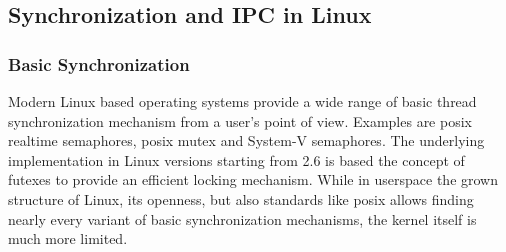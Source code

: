 %
%
%
%
%
%
%
%
%

\subsection{Synchronization and IPC in Linux}
\subsubsection*{Basic Synchronization}
Modern Linux based operating systems provide a wide range of basic thread synchronization mechanism from a user's point of view.
Examples are \ac{posix} realtime semaphores, \ac{posix} mutex and System-V semaphores\cite{glatz2015betriebssysteme}.
The underlying implementation in Linux versions starting from 2.6 is based the concept of futexes to provide an efficient locking mechanism\cite{tanenbaum-modern-operating-systems}.
While in userspace the grown structure of Linux, its openness, but also standards like \ac{posix} allows finding nearly every variant of basic synchronization mechanisms, the kernel itself is much more limited.


